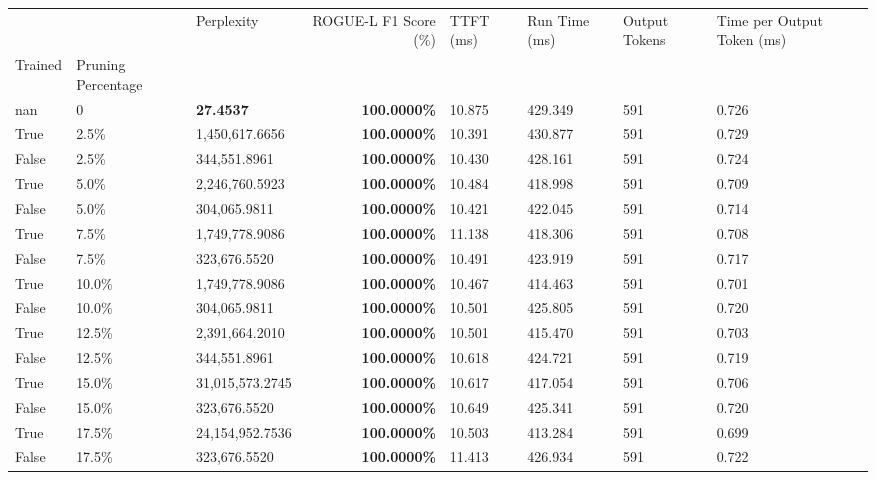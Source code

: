 \begin{table}[H]
\label{tab:evaluation-pipeline-4}
\begin{tabular}{lllrllll}
\toprule
 &  & Perplexity & ROGUE-L F1 Score (\%) & TTFT (ms) & Run Time (ms) & Output Tokens & Time per Output Token (ms) \\
Trained & Pruning Percentage &  &  &  &  &  &  \\
\midrule
nan & 0 & \bfseries 27.4537 & \bfseries 100.0000\% & 10.875 & 429.349 & 591 & 0.726 \\
\cline{1-8}
True & 2.5\% & 1,450,617.6656 & \bfseries \color{red} 100.0000\% & 10.391 & 430.877 & 591 & 0.729 \\
\cline{1-8}
False & 2.5\% & 344,551.8961 & \bfseries \color{red} 100.0000\% & 10.430 & 428.161 & 591 & 0.724 \\
\cline{1-8}
True & 5.0\% & 2,246,760.5923 & \bfseries \color{red} 100.0000\% & 10.484 & 418.998 & 591 & 0.709 \\
\cline{1-8}
False & 5.0\% & 304,065.9811 & \bfseries \color{red} 100.0000\% & 10.421 & 422.045 & 591 & 0.714 \\
\cline{1-8}
True & 7.5\% & 1,749,778.9086 & \bfseries \color{red} 100.0000\% & 11.138 & 418.306 & 591 & 0.708 \\
\cline{1-8}
False & 7.5\% & 323,676.5520 & \bfseries \color{red} 100.0000\% & 10.491 & 423.919 & 591 & 0.717 \\
\cline{1-8}
True & 10.0\% & 1,749,778.9086 & \bfseries \color{red} 100.0000\% & 10.467 & 414.463 & 591 & 0.701 \\
\cline{1-8}
False & 10.0\% & 304,065.9811 & \bfseries \color{red} 100.0000\% & 10.501 & 425.805 & 591 & 0.720 \\
\cline{1-8}
True & 12.5\% & 2,391,664.2010 & \bfseries \color{red} 100.0000\% & 10.501 & 415.470 & 591 & 0.703 \\
\cline{1-8}
False & 12.5\% & 344,551.8961 & \bfseries \color{red} 100.0000\% & 10.618 & 424.721 & 591 & 0.719 \\
\cline{1-8}
True & 15.0\% & 31,015,573.2745 & \bfseries \color{red} 100.0000\% & 10.617 & 417.054 & 591 & 0.706 \\
\cline{1-8}
False & 15.0\% & 323,676.5520 & \bfseries \color{red} 100.0000\% & 10.649 & 425.341 & 591 & 0.720 \\
\cline{1-8}
True & 17.5\% & 24,154,952.7536 & \bfseries \color{red} 100.0000\% & 10.503 & 413.284 & 591 & 0.699 \\
\cline{1-8}
False & 17.5\% & 323,676.5520 & \bfseries \color{red} 100.0000\% & 11.413 & 426.934 & 591 & 0.722 \\

\end{tabular}
\end{table}
